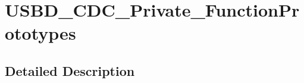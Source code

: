 \hypertarget{group___u_s_b_d___c_d_c___private___function_prototypes}{}\section{U\+S\+B\+D\+\_\+\+C\+D\+C\+\_\+\+Private\+\_\+\+Function\+Prototypes}
\label{group___u_s_b_d___c_d_c___private___function_prototypes}


\subsection{Detailed Description}
